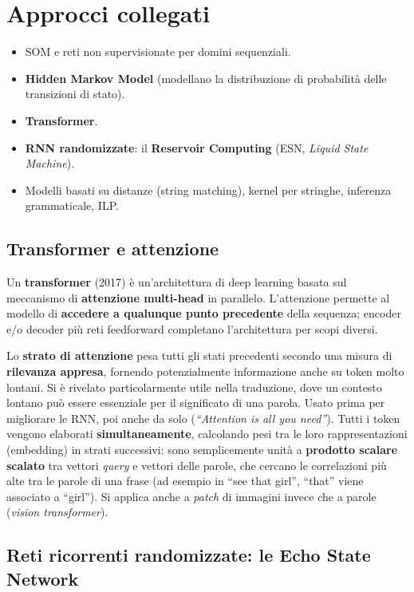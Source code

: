 \section{Approcci collegati}\label{approcci-collegati}

\begin{itemize}
\tightlist
\item
  SOM e reti non supervisionate per domini sequenziali.
\item
  \textbf{Hidden Markov Model} (modellano la distribuzione di
  probabilità delle transizioni di stato).
\item
  \textbf{Transformer}.
\item
  \textbf{RNN randomizzate}: il \textbf{Reservoir Computing} (ESN,
  \emph{Liquid State Machine}).
\item
  Modelli basati su distanze (string matching), kernel per stringhe,
  inferenza grammaticale, ILP.
\end{itemize}

\subsection{Transformer e attenzione}\label{transformer-e-attenzione}

Un \textbf{transformer} (2017) è un'architettura di deep learning basata
sul meccanismo di \textbf{attenzione multi-head} in parallelo.
L'attenzione permette al modello di \textbf{accedere a qualunque punto
precedente} della sequenza; encoder e/o decoder più reti feedforward
completano l'architettura per scopi diversi.

Lo \textbf{strato di attenzione} pesa tutti gli stati precedenti secondo
una misura di \textbf{rilevanza appresa}, fornendo potenzialmente
informazione anche su token molto lontani. Si è rivelato particolarmente
utile nella traduzione, dove un contesto lontano può essere essenziale
per il significato di una parola. Usato prima per migliorare le RNN, poi
anche da solo (\emph{``Attention is all you need''}). Tutti i token
vengono elaborati \textbf{simultaneamente}, calcolando pesi tra le loro
rappresentazioni (embedding) in strati successivi: sono semplicemente
unità a \textbf{prodotto scalare scalato} tra vettori \emph{query} e
vettori delle parole, che cercano le correlazioni più alte tra le parole
di una frase (ad esempio in ``see that girl'', ``that'' viene associato
a ``girl''). Si applica anche a \emph{patch} di immagini invece che a
parole (\emph{vision transformer}).

\subsection{Reti ricorrenti randomizzate: le Echo State
Network}\label{reti-ricorrenti-randomizzate-le-echo-state-network}

